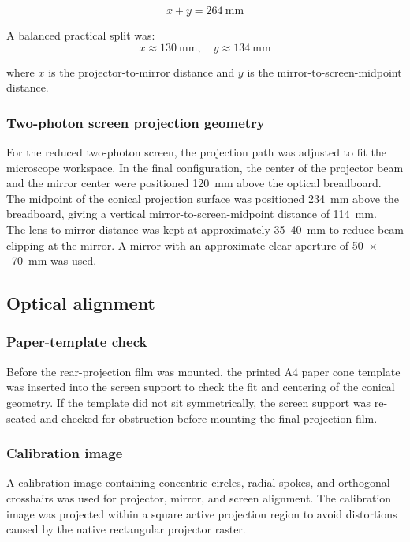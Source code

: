 \[
x + y = 264~\mathrm{mm}
\]

A balanced practical split was:\\

\[
x \approx 130~\mathrm{mm}, \quad y \approx 134~\mathrm{mm}
\]

where $x$ is the projector-to-mirror distance and $y$ is the mirror-to-screen-midpoint distance.\\

\subsubsection{Two-photon screen projection geometry}

For the reduced two-photon screen, the projection path was adjusted to fit the microscope workspace. In the final configuration, the center of the projector beam and the mirror center were positioned 120~mm above the optical breadboard. The midpoint of the conical projection surface was positioned 234~mm above the breadboard, giving a vertical mirror-to-screen-midpoint distance of 114~mm.\\

The lens-to-mirror distance was kept at approximately 35--40~mm to reduce beam clipping at the mirror. A mirror with an approximate clear aperture of 50~$\times$~70~mm was used.\\

\subsection{Optical alignment}

\subsubsection{Paper-template check}

Before the rear-projection film was mounted, the printed A4 paper cone template was inserted into the screen support to check the fit and centering of the conical geometry. If the template did not sit symmetrically, the screen support was re-seated and checked for obstruction before mounting the final projection film.\\

\subsubsection{Calibration image}

A calibration image containing concentric circles, radial spokes, and orthogonal crosshairs was used for projector, mirror, and screen alignment. The calibration image was projected within a square active projection region to avoid distortions caused by the native rectangular projector raster.\\

